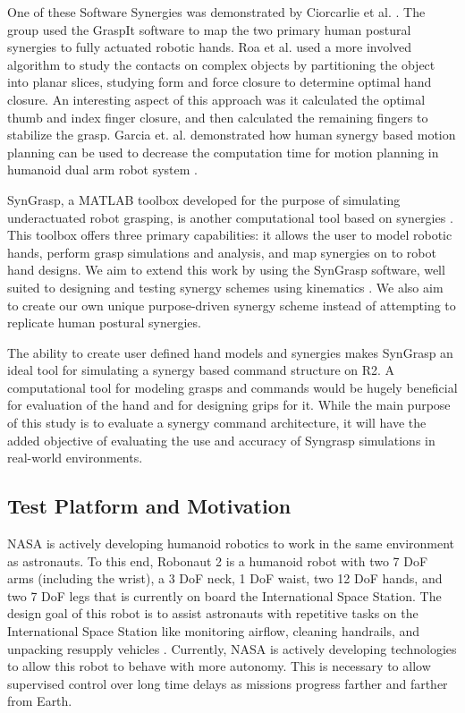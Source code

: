 \documentclass[runningheads,a4paper]{llncs}
\begin{document}
 One of these Software Synergies was demonstrated by Ciorcarlie et al. \cite{ciocarlie_2007_dexterous}.  The group used the GraspIt software to map the two primary human postural synergies to fully actuated robotic hands.  Roa et al. \cite{power_grasp} used a more involved algorithm to study the contacts on complex objects by partitioning the object into planar slices, studying form and force closure  \cite{bicchi} to determine optimal hand closure. An interesting aspect of this approach was it calculated the optimal thumb and index finger closure, and then calculated the remaining fingers to stabilize the grasp.   Garcia et. al. demonstrated how human synergy based motion planning can be used to decrease the computation time for motion planning in humanoid dual arm robot system  \cite{garcia}.

SynGrasp, a MATLAB toolbox developed for the purpose of simulating underactuated robot grasping, is another computational tool based on synergies \cite{syngrasp}.  This toolbox offers three primary capabilities: it allows the user to model robotic hands, perform grasp simulations and analysis, and map synergies on to robot hand designs. We aim to extend this work by using the SynGrasp software, well suited to designing and testing  synergy schemes using kinematics \cite{salvietti_2016_map}.  We also aim to create our own unique purpose-driven synergy scheme instead of attempting to replicate human postural synergies.

The ability to create user defined hand models and synergies makes SynGrasp an ideal tool for simulating a synergy based command structure on R2.  A computational tool for modeling grasps and commands would be hugely beneficial for evaluation of the hand and for designing grips for it.%
While the main purpose of this study is to evaluate a synergy command architecture, it will have the added objective of evaluating the use and accuracy of Syngrasp simulations in real-world environments.

\subsection{Test Platform and Motivation}

NASA is actively developing humanoid robotics to work in the same environment as astronauts. To this end, Robonaut 2 is a humanoid robot with two 7 DoF arms (including the wrist), a 3 DoF neck, 1 DoF waist, two 12 DoF hands, and two 7 DoF legs that is currently on board the International Space Station. The design goal of this robot is to assist astronauts with repetitive tasks on the International Space Station like monitoring airflow, cleaning handrails, and unpacking resupply vehicles \cite{r2_diftler}. Currently, NASA is actively developing technologies to allow this robot to behave with more autonomy. This is necessary to allow supervised control over long time delays as missions progress farther and farther from Earth. 
\end{document}
